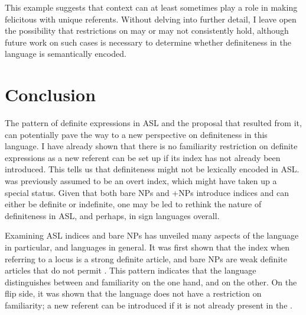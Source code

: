 \documentclass[output=paper,
modfonts
]{langscibook}
\begin{document}
\begin{exe} 
	
	
\end{exe} 

\noindent This example suggests that context can at least sometimes play a role in making  felicitous with unique referents. Without delving into further detail, I leave open the possibility that  restrictions on  may or may not consistently hold, although future work on such cases is necessary to determine whether definiteness in the language is semantically encoded.  

\section{Conclusion}

The pattern of definite expressions in ASL and the proposal that resulted from it, can potentially pave the way to a new perspective on definiteness in this language. I have already shown that there is no familiarity restriction on definite expressions as a new referent can be set up if its index has not already been introduced. This tells us that definiteness might not be lexically encoded in ASL.  was previously assumed to be an overt index, which might have taken up a special status. Given that both bare NPs and +NPs introduce indices and can either be definite or indefinite, one may be led to rethink the nature of definiteness in ASL, and perhaps, in sign languages overall. 

Examining ASL indices and bare NPs has unveiled many aspects of the language in particular, and languages in general. It was first shown that the index  when referring to a locus is a strong definite article, and bare NPs are weak definite articles that do not permit . This pattern indicates that the language distinguishes between  and familiarity on the one hand, and  on the other. On the flip side, it was shown that the language does not have a restriction on familiarity; a new referent can be introduced if it is not already present in the .  
\end{document}
